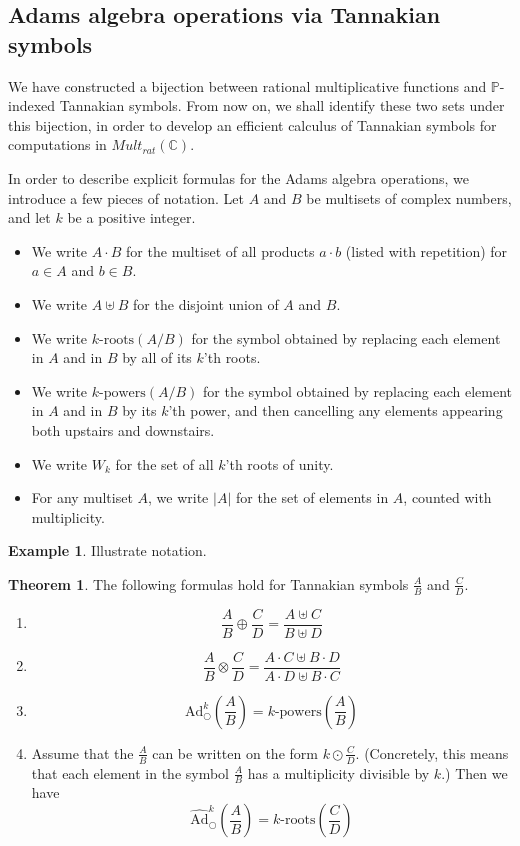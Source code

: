 \documentclass[a4paper]{article}
\theoremstyle{definition}
\newtheorem{theorem}{Theorem}[section]
\newtheorem{example}{Example}[section]
\theoremstyle{remark}
\newcommand{\adam}[1]{\text{Ad}^{#1}_{\bigcirc}}
\newcommand{\hatadam}[1]{\widehat{\text{Ad}}^{#1}_{\bigcirc}}
\newcommand{\roots}[1]{{#1}\text{-roots}}
\newcommand{\powers}[1]{{#1}\text{-powers}}
\begin{document}
\subsection{Adams algebra operations via Tannakian symbols}

We have constructed a bijection between rational multiplicative functions and $\mathbb{P}$-indexed Tannakian symbols. From now on, we shall identify these two sets under this bijection, in order to develop an efficient calculus of Tannakian symbols for computations in $Mult_{rat}(\mathbb{C})$.

In order to describe explicit formulas for the Adams algebra operations, we introduce a few pieces of notation. Let $A$ and $B$ be multisets of complex numbers, and let $k$ be a positive integer.

\begin{itemize}
\item We write $A \cdot B$ for the multiset of all products $a \cdot b$ (listed with repetition) for $a \in A$ and $b \in B$.
\item We write $A \uplus B $ for the disjoint union of $A$ and $B$.
\item We write $\roots{k}(A/B)$ for the symbol obtained by replacing each element in $A$ and in $B$ by all of its $k$'th roots.
\item We write $\powers{k}(A/B)$ for the symbol obtained by replacing each element in $A$ and in $B$ by its $k$'th power, and then cancelling any elements appearing both upstairs and downstairs.
\item We write $W_k$ for the set of all $k$'th roots of unity.
\item For any multiset $A$, we write $\vert A \vert$ for the set of elements in $A$, counted with multiplicity.
\end{itemize}

\begin{example}
Illustrate notation.
\end{example}

\begin{theorem}
The following formulas hold for Tannakian symbols $\frac{A}{B}$ and $\frac{C}{D}$.
\begin{enumerate}
\item $$\frac{A}{B} \oplus \frac{C}{D} = \frac{A \uplus C}{B \uplus D}$$
\item $$\frac{A}{B} \otimes \frac{C}{D} = \frac{ A \cdot C \uplus B \cdot D }{ A \cdot D \uplus B \cdot C }$$
\item $$\adam{k} \left(\frac{A}{B} \right) = \powers{k} \left(\frac{A}{B} \right)$$
\item Assume that the $\frac{A}{B}$ can be written on the form $k \odot \frac{C}{D}$. (Concretely, this means that each element in the symbol $\frac{A}{B}$ has a multiplicity divisible by $k$.) Then we have
$$ \hatadam{k}\left(\frac{A}{B}\right) = \roots{k} \left( \frac{C}{D} \right)  $$
\end{enumerate}
\end{theorem}
\end{document}
